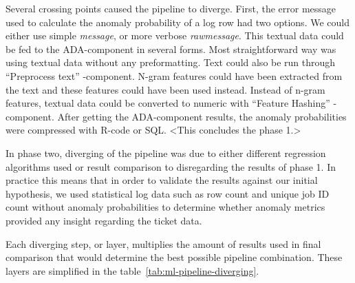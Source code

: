 Several crossing points caused the pipeline to diverge.
First,
the error message used to calculate the anomaly probability of a log row
had two options.
We could either use simple \textit{message},
or more verbose \textit{rawmessage}.
This textual data could be fed to the ADA-component in several forms.
Most straightforward way was using textual data without any preformatting.
Text could also be run through \enquote{Preprocess text} -component. %
N-gram features could have been extracted from the text
and these features could have been used instead.
Instead of n-gram features,
textual data could be converted to numeric
with \enquote{Feature Hashing} -component.
After getting the ADA-component results,
the anomaly probabilities were compressed with R-code or SQL. %
<This concludes the phase 1.> %

In phase two,
diverging of the pipeline was due to either different regression algorithms used
or result comparison to disregarding the results of phase 1.
In practice this means
that in order to validate the results against our initial hypothesis,
we used statistical log data such as row count and unique job ID count
without anomaly probabilities
to determine whether anomaly metrics provided any insight regarding the ticket data.

Each diverging step, or layer,
multiplies the amount of results used in final comparison
that would determine the best possible pipeline combination.
These layers are simplified in the table~\ref{tab:ml-pipeline-diverging}.

